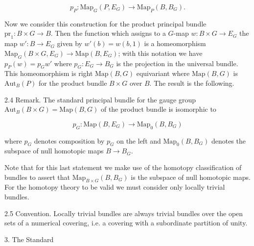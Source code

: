 $$p_P: \text{Map}_G(P, E_G) \rightarrow \text{Map}_P(B, B_G).$$

Now we consider this construction for the product principal bundle $\text{pr}_1: B \times G \rightarrow B$. Then the function which assigns to a $G$-map $w: B \times G \rightarrow E_G$ the map $w': B \rightarrow E_G$ given by $w'(b) = w(b, 1)$ is a homeomorphism $\text{Map}_G(B \times G, E_G) \rightarrow \text{Map}(B, E_G)$; with this notation we have $p_P(w) = p_G w'$ where $p_G: E_G \rightarrow B_G$ is the projection in the universal bundle. This homeomorphism is right $\text{Map}(B, G)$ equivariant where $\text{Map}(B, G)$ is $\text{Aut}_B(P)$ for the product bundle $B \times G$ over $B$. The result is the following.

2.4 Remark. The standard principal bundle for the gauge group $\text{Aut}_B(B \times G) = \text{Map}(B, G)$ of the product bundle is isomorphic to

$$p_G: \text{Map}(B, E_G) \rightarrow \text{Map}_0(B, B_G)$$

where $p_G$ denotes composition by $p_G$ on the left and $\text{Map}_0(B, B_G)$ denotes the subspace of null homotopic maps $B \rightarrow B_G$.

Note that for this last statement we make use of the homotopy classification of bundles to assert that $\text{Map}_{B \times G}(B, B_G)$ is the subspace of null homotopic maps. For the homotopy theory to be valid we must consider only locally trivial bundles.

2.5 Convention. Locally trivial bundles are always trivial bundles over the open sets of a numerical covering, i.e. a covering with a subordinate partition of unity.

3. The Standard
